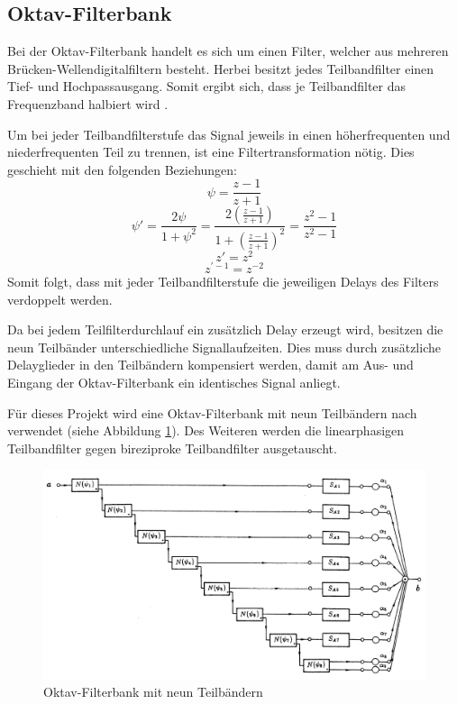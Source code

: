 \subsection{Oktav-Filterbank}
Bei der Oktav-Filterbank handelt es sich um einen Filter, welcher aus mehreren Brücken-Wellendigitalfiltern besteht. Herbei besitzt jedes Teilbandfilter einen Tief- und Hochpassausgang. Somit ergibt sich, dass je Teilbandfilter das Frequenzband halbiert wird \cite[vgl.][S. 90]{kunold1989}.\par
Um bei jeder Teilbandfilterstufe das Signal jeweils in einen höherfrequenten und niederfrequenten Teil zu trennen, ist eine Filtertransformation nötig. Dies geschieht mit den folgenden Beziehungen:
\begin{equation}
\psi = \frac{z - 1}{z + 1}
\end{equation}
\begin{equation}
\psi' = \frac{2 \psi}{1 + \psi^2} = \frac{2 \left(\frac{z - 1}{z + 1}\right)}{1 + \left(\frac{z - 1}{z + 1}\right)^2} = \frac{z^2 - 1}{z^2 - 1}
\end{equation}
\begin{equation}
z' = z^2
\end{equation}
\begin{equation}
z^{'-1} = z^{-2}
\end{equation}
Somit folgt, dass mit jeder Teilbandfilterstufe die jeweiligen Delays des Filters verdoppelt werden.\par
Da bei jedem Teilfilterdurchlauf ein zusätzlich Delay erzeugt wird, besitzen die neun Teilbänder unterschiedliche Signallaufzeiten. Dies muss durch zusätzliche Delayglieder in den Teilbändern kompensiert werden, damit am Aus- und Eingang der Oktav-Filterbank ein identisches Signal anliegt.\par
Für dieses Projekt wird eine Oktav-Filterbank mit neun Teilbändern nach \cite[][]{kunold1989} verwendet (siehe Abbildung \ref{fig:OktavFilterbank}). Des Weiteren werden die linearphasigen Teilbandfilter gegen bireziproke Teilbandfilter ausgetauscht.
\begin{figure}[h!]
	\centering	\includegraphics[width=15cm]{img/OktavFilter.png}
	\caption{Oktav-Filterbank mit neun Teilbändern \cite[][S. 95]{kunold1989}}
	\label{fig:OktavFilterbank}
\end{figure}